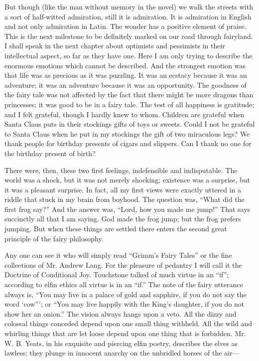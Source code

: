 But though (like the man without memory in the novel) we walk the streets with a sort of half-witted admiration, still it is admiration. It is admiration in English and not only admiration in Latin. The wonder has a positive element of praise. This is the next milestone to be definitely marked on our road through fairyland. I shall speak in the next chapter about optimists and pessimists in their intellectual aspect, so far as they have one. Here I am only trying to describe the enormous emotions which cannot be described. And the strongest emotion was that life was as precious as it was puzzling. It was an ecstacy because it was an adventure; it was an adventure because it was an opportunity. The goodness of the fairy tale was not affected by the fact that there might be more dragons than princesses; it was good to be in a fairy tale. The test of all happiness is gratitude; and I felt grateful, though I hardly knew to whom. Children are grateful when Santa Claus puts in their stockings gifts of toys or sweets. Could I not be grateful to Santa Claus when he put in my stockings the gift of two miraculous legs? We thank people for birthday presents of cigars and slippers. Can I thank no one for the birthday present of birth?

There were, then, these two first feelings, indefensible and indisputable. The world was a shock, but it was not merely shocking; existence was a surprise, but it was a pleasant surprise. In fact, all my first views were exactly uttered in a riddle that stuck in my brain from boyhood. The question was, “What did the first frog say?” And the answer was, “Lord, how you made me jump!” That says succinctly all that I am saying. God made the frog jump; but the frog prefers jumping. But when these things are settled there enters the second great principle of the fairy philosophy.

Any one can see it who will simply read “Grimm’s Fairy Tales” or the fine collections of Mr. Andrew Lang. For the pleasure of pedantry I will call it the Doctrine of Conditional Joy. Touchstone talked of much virtue in an “if”; according to elfin ethics all virtue is in an “if.” The note of the fairy utterance always is, “You may live in a palace of gold and sapphire, if you do not say the word ‘cow”’; or “You may live happily with the King’s daughter, if you do not show her an onion.” The vision always hangs upon a veto. All the dizzy and colossal things conceded depend upon one small thing withheld. All the wild and whirling things that are let loose depend upon one thing that is forbidden. Mr. W. B. Yeats, in his exquisite and piercing elfin poetry, describes the elves as lawless; they plunge in innocent anarchy on the unbridled horses of the air—

